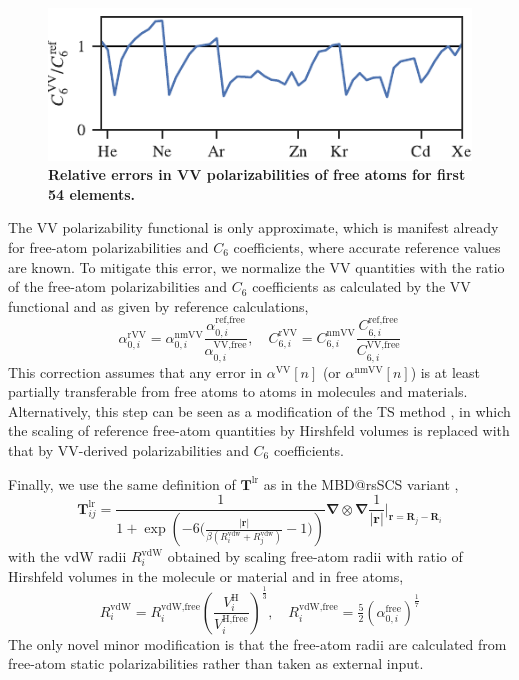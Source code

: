 \begin{figure}[t!]
\centering
\includegraphics{../media/vv-periodic-table.pdf}
\caption{\textbf{Relative errors in VV polarizabilities of free atoms for first 54 elements.}
}\label{fig:vv-periodic-table}
\end{figure}

The VV polarizability functional is only approximate, which is manifest already for free-atom polarizabilities and $C_6$ coefficients, where accurate reference values are known.
To mitigate this error, we normalize the VV quantities with the ratio of the free-atom polarizabilities and $C_6$ coefficients as calculated by the VV functional and as given by reference calculations,
\begin{equation}
  \alpha_{0,i}^\text{rVV}=\alpha_{0,i}^\text{nmVV}\frac{\alpha_{0,i}^\text{ref,free}}{\alpha_{0,i}^\text{VV,free}},\quad
  C_{6,i}^\text{rVV}=C_{6,i}^\text{nmVV}\frac{C_{6,i}^\text{ref,free}}{C_{6,i}^\text{VV,free}}
\end{equation}
This correction assumes that any error in $\alpha^\text{VV}[n]$ (or $\alpha^\text{nmVV}[n]$) is at least partially transferable from free atoms to atoms in molecules and materials.
Alternatively, this step can be seen as a modification of the TS method \citep{TkatchenkoPRL09}, in which the scaling of reference free-atom quantities by Hirshfeld volumes is replaced with that by VV-derived polarizabilities and $C_6$ coefficients.

Finally, we use the same definition of $\mathbf T^\text{lr}$ as in the MBD@rsSCS variant \citep{AmbrosettiJCP14},
\begin{equation}
  \mathbf T_{ij}^\text{lr}=\frac1{1+\exp\left(-6\Big(\frac{|\mathbf r|}{\beta(R_i^\text{vdw}+R_j^\text{vdw})}-1\Big)\!\!\right)}\boldsymbol\nabla\otimes\boldsymbol\nabla\frac1{|\mathbf r|}\Bigg|_{\mathbf r=\mathbf R_j-\mathbf R_i}
\end{equation}
with the vdW radii $R_i^\text{vdW}$ obtained by scaling free-atom radii with ratio of Hirshfeld volumes in the molecule or material and in free atoms,
\begin{equation}
  R_i^\text{vdW}=R_i^\text{vdW,free}{\left(\frac{V_i^\text{H}}{V_i^\text{H,free}}\right)}^\frac13,\quad
  R_i^\text{vdW,free}=\tfrac52{(\alpha_{0,i}^\text{free})}^\frac17
\end{equation}
The only novel minor modification is that the free-atom radii are calculated from free-atom static polarizabilities \citep{FedorovPRL18} rather than taken as external input.


